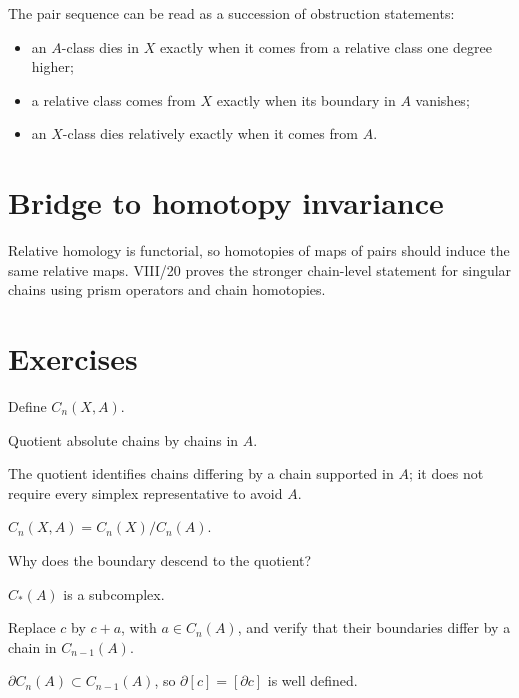 The pair sequence can be read as a succession of obstruction statements:
\begin{itemize}
\item an \(A\)-class dies in \(X\) exactly when it comes from a relative class
one degree higher;
\item a relative class comes from \(X\) exactly when its boundary in \(A\)
vanishes;
\item an \(X\)-class dies relatively exactly when it comes from \(A\).
\end{itemize}

\section{Bridge to homotopy invariance}

Relative homology is functorial, so homotopies of maps of pairs should induce
the same relative maps.  VIII/20 proves the stronger chain-level statement for
singular chains using prism operators and chain homotopies.


\section{Exercises}

\begin{exercise}\label{exr:viii19-01}
Define \(C_n(X,A)\).
\end{exercise}
\begin{hint}
Quotient absolute chains by chains in \(A\).

The quotient identifies chains differing by a chain supported in \(A\); it does not require every simplex representative to avoid \(A\).
\end{hint}
\begin{solution}
\(C_n(X,A)=C_n(X)/C_n(A)\).
\end{solution}

\begin{exercise}\label{exr:viii19-02}
Why does the boundary descend to the quotient?
\end{exercise}
\begin{hint}
\(C_*(A)\) is a subcomplex.

Replace \(c\) by \(c+a\), with \(a\in C_n(A)\), and verify that their boundaries differ by a chain in \(C_{n-1}(A)\).
\end{hint}
\begin{solution}
\(\partial C_n(A)\subset C_{n-1}(A)\), so \(\partial[c]=[\partial c]\) is well defined.
\end{solution}

